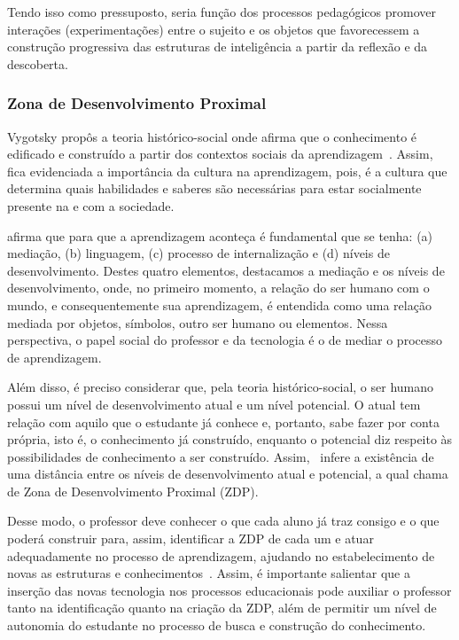 Tendo isso como pressuposto, seria função dos processos pedagógicos promover interações (experimentações) entre o sujeito e os objetos que favorecessem a construção progressiva das estruturas de inteligência a partir da reflexão e da descoberta.

\subsubsection{Zona de Desenvolvimento Proximal}
Vygotsky propôs a teoria histórico-social onde afirma que o conhecimento é edificado e construído a partir dos contextos sociais da aprendizagem~\citep{Vygotsky:1998}. Assim, fica evidenciada a importância da cultura na aprendizagem, pois, é a cultura que determina quais habilidades e saberes são necessárias para estar socialmente presente na e com a sociedade.

\cite{Rego:2013} afirma que para que a aprendizagem aconteça é fundamental que se tenha: (a) mediação, (b) linguagem, (c) processo de internalização e (d) níveis de desenvolvimento. Destes quatro elementos, destacamos a mediação e os níveis de desenvolvimento, onde, no primeiro momento, a relação do ser humano com o mundo, e consequentemente sua aprendizagem, é entendida como uma relação mediada por objetos, símbolos, outro ser humano ou elementos. Nessa perspectiva, o papel social do professor e da tecnologia é o de mediar o processo de aprendizagem.

Além disso, é preciso considerar que, pela teoria histórico-social, o ser humano possui um nível de desenvolvimento atual e um nível potencial. O atual tem relação com aquilo que o estudante já conhece e, portanto, sabe fazer por conta própria, isto é, o conhecimento já construído, enquanto o potencial diz respeito às possibilidades de conhecimento a ser construído. Assim,~\cite{Vygotsky:1998} infere a existência de uma distância entre os níveis de desenvolvimento atual e potencial, a qual chama de Zona de Desenvolvimento Proximal (ZDP). %

Desse modo, o professor deve conhecer o que cada aluno já traz consigo e o que poderá construir para, assim, identificar a ZDP de cada um e atuar adequadamente no processo de aprendizagem, ajudando no estabelecimento de novas as estruturas e conhecimentos~\cite{Almeida:2000}. Assim, é importante salientar que a inserção das novas tecnologia nos processos educacionais pode auxiliar o professor tanto na identificação quanto na criação da ZDP, além de permitir um nível de autonomia do estudante no processo de busca e construção do conhecimento.


